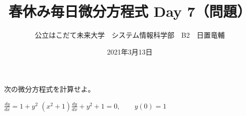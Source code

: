 \documentclass[dvipdfmx,uplatex]{jsarticle}
\title{春休み毎日微分方程式 Day 7（問題）}
\author{公立はこだて未来大学　システム情報科学部　B2　日置竜輔}
\date{2021年3月13日}
\begin{document}
\begin{spacing}{1.6}
\maketitle

次の微分方程式を計算せよ。
\begin{qparts}
    \qpart $ \displaystyle \frac{dy}{dx} = 1 + y ^ 2 $
    \qpart $ \displaystyle (x^2 + 1)\frac{dy}{dx} + y ^ 2 + 1 = 0, \qquad y(0) = 1 $
  \end{qparts}
\end{spacing}
\end{document}
